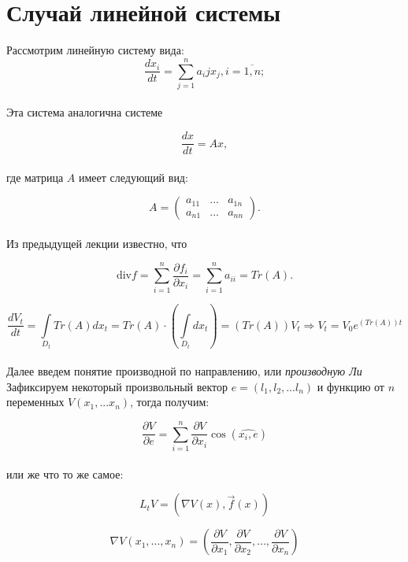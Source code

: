 \section{Случай линейной системы}
Рассмотрим линейную систему вида:
$$
\frac{dx_i}{dt}=\sum_{j=1}^n{a_ij x_j}, i=\overline{1,n};
$$\\
Эта система аналогична системе 

$$
	\frac{dx}{dt}=Ax, 
$$\\
где матрица $A$ имеет следующий вид:

$$
	A=\begin{pmatrix}a_{11} & ... & a_{1n}\\ a_{n1} & ... & a_{nn}\end{pmatrix}.
$$\\
Из предыдущей лекции известно, что

$$
	\mbox{div}f=\sum_{i=1}^n{\frac{\partial f_i}{\partial x_i}}=\sum_{i=1}^n{a_{ii}}=Tr(A).
$$

$$
	\frac{dV_t}{dt}=\int\limits_{D_t}{Tr(A)}dx_t=Tr(A)\cdot \left(\int\limits_{D_t}{dx_t}\right)=(Tr(A))V_t \Rightarrow V_t=V_0e^{(Tr(A))t}
$$\\
Далее введем понятие производной по направлению, или \textit{производную Ли}\\
Зафиксируем некоторый произвольный вектор $e=(l_1,l_2,...l_n)$ и функцию от $n$ переменных $V(x_1,...x_n)$, тогда получим:

$$\frac{\partial V}{\partial e}=\sum_{i=1}^n{\frac{\partial V}{\partial x_i}}\cos(\widehat{x_i, e})$$\\
или же что то же самое:

$$
	L_tV=(\nabla V(x), \overrightarrow{f}(x))
$$

$$
	\nabla V(x_1,...,x_n)=\left(\frac{\partial V}{\partial x_1},\frac{\partial V}{\partial x_2},...,\frac{\partial V}{\partial x_n}\right)
$$\\

